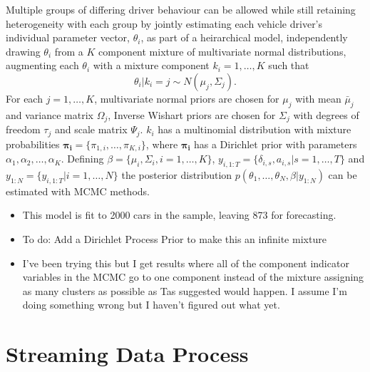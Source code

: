 \documentclass[12pt,a4paper]{article}\usepackage[]{graphicx}\usepackage[]{color}
\begin{document}
Multiple groups of differing driver behaviour can be allowed while still retaining heterogeneity with each group by jointly estimating each vehicle driver's individual parameter vector, $\theta_i$, as part of a heirarchical model, independently drawing $\theta_i$ from a $K$ component mixture of multivariate normal distributions, augmenting each $\theta_i$ with a mixture component $k_i = 1, \dots, K$ such that 
\begin{equation}
\theta_i | k_i = j \sim N(\mu_j, \Sigma_j).
\end{equation}
For each $j = 1, \dots, K$, multivariate normal priors are chosen for $\mu_j$ with mean $\bar{\mu}_j$ and variance matrix $\Omega_j$, Inverse Wishart priors are chosen for $\Sigma_j$ with degrees of freedom $\tau_j$ and scale matrix $\Psi_j$. $k_{i}$ has a multinomial distribution with mixture probabilities $\boldsymbol{\pi_i} = \{\pi_{1, i}, \dots, \pi_{K, i}\}$, where $\boldsymbol{\pi_i}$ has a Dirichlet prior with parameters $\alpha_1, \alpha_2, \dots, \alpha_K$. Defining $\beta = \{\mu_i, \Sigma_i, i = 1, \dots, K\}$, $y_{i, 1:T} = \{\delta_{i, s}, a_{i, s} | s = 1, \dots, T\}$ and $y_{1:N} = \{y_{i, 1:T} | i = 1, \dots, N\}$ the posterior distribution $p(\theta_1, \dots, \theta_N, \beta | y_{1:N})$ can be estimated with MCMC methods.


\begin{itemize}
\item This model is fit to 2000 cars in the sample, leaving 873 for forecasting.
\item To do: Add a Dirichlet Process Prior to make this an infinite mixture
\item I've been trying this but I get results where all of the component indicator variables in the MCMC go to one component instead of the mixture assigning as many clusters as possible as Tas suggested would happen. I assume I'm doing something wrong but I haven't figured out what yet.
\end{itemize}

\section{Streaming Data Process}
\end{document}
